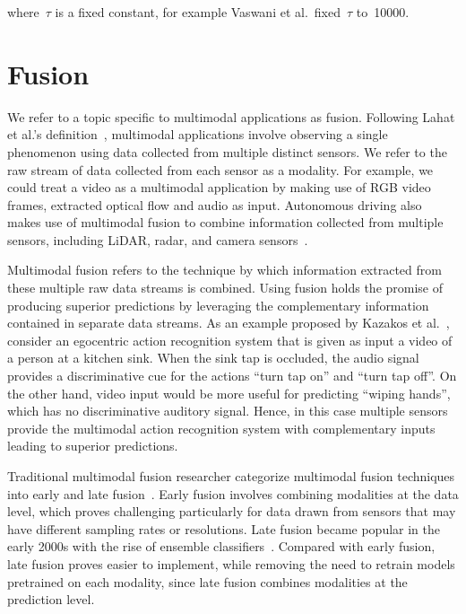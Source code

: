 \noindent where~$\tau$ is a fixed constant, for example Vaswani et al.\ fixed~$\tau$
to~\num{10000}.






\section{Fusion}

We refer to a topic specific to multimodal applications as fusion.
Following Lahat et al.'s definition~\cite{Lahat2015MultimodalDF}, multimodal
applications involve observing a single phenomenon using data collected from
multiple distinct sensors.
We refer to the raw stream of data collected from each sensor as a modality.
For example, we could treat a video as a multimodal application by making use
of RGB video frames, extracted optical flow and audio as input.
Autonomous driving also makes use of multimodal fusion to combine information
collected from multiple sensors, including LiDAR, radar, and camera
sensors~\cite{Feng2019DeepMO}.

Multimodal fusion refers to the technique by which information extracted from
these multiple raw data streams is combined.
Using fusion holds the promise of producing superior predictions by leveraging
the complementary information contained in separate data streams.
As an example proposed by Kazakos et al.~\cite{kazakos2019TBN}, consider an
egocentric action recognition system that is given as input a video of a person
at a kitchen sink.
When the sink tap is occluded, the audio signal provides a discriminative cue
for the actions ``turn tap on'' and ``turn tap off''.
On the other hand, video input would be more useful for predicting ``wiping
hands'', which has no discriminative auditory signal.
Hence, in this case multiple sensors provide the multimodal action recognition
system with complementary inputs leading to superior predictions.

Traditional multimodal fusion researcher categorize multimodal fusion
techniques into early and late fusion~\cite{ramachandram2017deepmultimodal}.
Early fusion involves combining modalities at the data level, which proves
challenging particularly for data drawn from sensors that may have different
sampling rates or resolutions.
Late fusion became popular in the early 2000s with the rise of ensemble
classifiers~\cite{kuncheva2004combining}.
Compared with early fusion, late fusion proves easier to implement, while
removing the need to retrain models pretrained on each modality, since late
fusion combines modalities at the prediction level.

